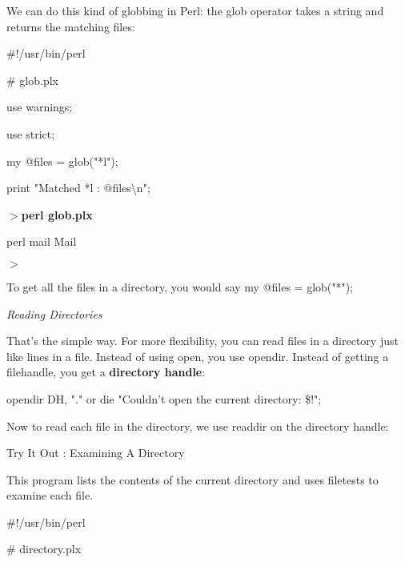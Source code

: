 \documentclass[a4paper,11pt]{book}
\begin{document}
\noindent We can do this kind of globbing in Perl: the glob operator takes a string and returns the matching files:

\noindent 

\noindent 

\noindent \#!/usr/bin/perl

\noindent \# glob.plx

\noindent use warnings;

\noindent use strict;

\noindent 

\noindent my @files = glob("*l");

\noindent print "Matched *l : @files\textbackslash n";

\noindent 

\noindent $>$\textbf{perl glob.plx}

\noindent perl mail Mail

\noindent $>$

\noindent To get all the files in a directory, you would say my @files = glob("*");

\noindent 

\noindent 

\noindent \textit{Reading Directories}

\noindent That's the simple way. For more flexibility, you can read files in a directory just like lines in a file. Instead of using open, you use opendir. Instead of getting a filehandle, you get a \textbf{directory handle}:

\noindent 

\noindent 

\noindent opendir DH, "." or die "Couldn't open the current directory: \$!";

\noindent 

\noindent Now to read each file in the directory, we use readdir on the directory handle:

\noindent 

\noindent 

\noindent Try It Out : Examining A Directory

\noindent 

\noindent 

\noindent This program lists the contents of the current directory and uses filetests to examine each file.

\noindent 

\noindent 

\noindent \#!/usr/bin/perl

\noindent \# directory.plx
\end{document}
